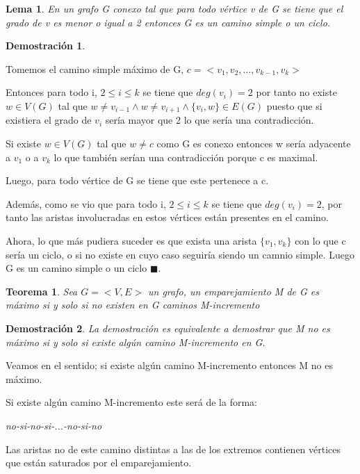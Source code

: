 \documentclass[a4paper,1pt]{report}
\newtheorem*{teo}{Teorema}
\newtheorem*{dem}{Demostración}
\newtheorem*{lem}{Lema}
\begin{document}
\begin{lem}
 En un grafo G conexo tal que para todo vértice  v de G se tiene que el grado de v es menor o igual a 2 entonces G es un camino simple o un ciclo.
\end{lem}

\begin{dem}
 
\end{dem}


Tomemos el camino simple máximo de G, $c=<v_1,v_2,\dots,v_{k-1},v_k>$

Entonces para todo i, $2\leq i \leq k$ se tiene que $deg(v_i)=2$ por tanto no existe $w\in V(G)$ tal que  $w\neq v_{i-1}\wedge w\neq v_{i+1}\wedge \{v_i,w\}\in E(G)$ puesto que si existiera el grado de $v_i$ sería mayor que 2 lo que sería una contradicción.

Si existe $w\in V(G)$ tal que $w\neq c$ como G  es conexo entonces w sería adyacente a $v_1$ o a $v_k$ lo que también serían una contradicción porque c es maximal.

Luego, para todo vértice de G se tiene que este pertenece a c.

Además, como se vio que para todo i, $2\leq i \leq k$ se tiene que $deg(v_i)=2$, por  tanto las aristas involucradas en estos vértices están presentes en el camino.

Ahora, lo que más pudiera suceder es que exista una arista $\{v_1,v_k\}$ con lo que c sería un ciclo, o si no existe  en cuyo caso seguiría siendo un camnio simple.  Luego G es un camino simple o un ciclo $\blacksquare$.


\begin{teo}
 Sea $G=<V,E>$ un grafo, un emparejamiento M de G es máximo si y solo si no existen en G caminos M-incremento
\end{teo}



\begin{dem}
La demostración es equivalente a demostrar que M no es máximo si y solo si existe algún camino M-incremento en G. 
\end{dem}

Veamos en el sentido; si existe algún camino M-incremento entonces M no es máximo.

Si existe algún camino M-incremento este será de la forma:

\textit{no-si-no-si-...-no-si-no}

Las aristas no de este camino distintas a las de los extremos contienen vértices que están saturados por el emparejamiento.
\end{document}
